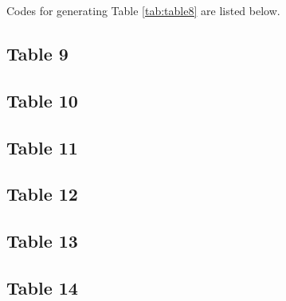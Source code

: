 \documentclass{article}
\begin{document}
Codes for generating Table \ref{tab:table8} are listed below.


\subsection{Table 9}

\subsection{Table 10}

\subsection{Table 11}

\subsection{Table 12}

\subsection{Table 13}

\subsection{Table 14}
\end{document}
